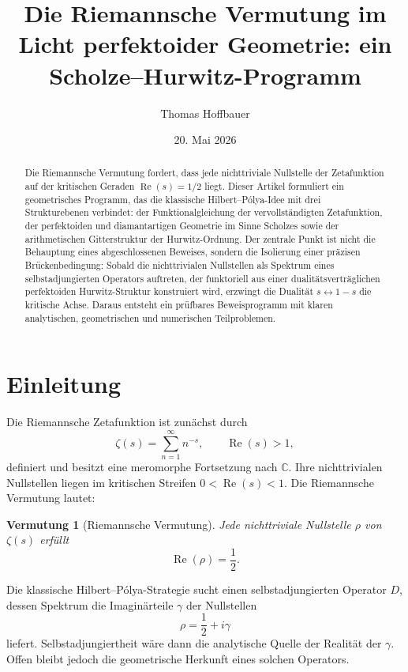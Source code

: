 \documentclass[11pt,a4paper,reqno]{amsart}
\title[RH, Scholze und Hurwitz-Geometrie]{Die Riemannsche Vermutung im Licht perfektoider Geometrie: ein Scholze--Hurwitz-Programm}
\author{Thomas Hoffbauer}
\date{20. Mai 2026}
\newtheorem{conjecture}[theorem]{Vermutung}
\theoremstyle{definition}
\numberwithin{equation}{section}
\newcommand{\C}{\mathbb{C}}
\newcommand{\Reals}{\operatorname{Re}}
\begin{document}
\begin{abstract}
Die Riemannsche Vermutung fordert, dass jede nichttriviale Nullstelle der Zetafunktion auf der kritischen Geraden
\(\Reals(s)=1/2\) liegt. Dieser Artikel formuliert ein geometrisches Programm, das die klassische Hilbert--Pólya-Idee mit drei Strukturebenen verbindet: der Funktionalgleichung der vervollständigten Zetafunktion, der perfektoiden und diamantartigen Geometrie im Sinne Scholzes sowie der arithmetischen Gitterstruktur der Hurwitz-Ordnung. Der zentrale Punkt ist nicht die Behauptung eines abgeschlossenen Beweises, sondern die Isolierung einer präzisen Brückenbedingung: Sobald die nichttrivialen Nullstellen als Spektrum eines selbstadjungierten Operators auftreten, der funktoriell aus einer dualitätsverträglichen perfektoiden Hurwitz-Struktur konstruiert wird, erzwingt die Dualität \(s\leftrightarrow 1-s\) die kritische Achse. Daraus entsteht ein prüfbares Beweisprogramm mit klaren analytischen, geometrischen und numerischen Teilproblemen.
\end{abstract}

\maketitle

\tableofcontents

\section{Einleitung}

Die Riemannsche Zetafunktion ist zunächst durch
\begin{equation}
  \zeta(s)=\sum_{n=1}^{\infty}n^{-s},\qquad \Reals(s)>1,
\end{equation}
definiert und besitzt eine meromorphe Fortsetzung nach \(\C\). Ihre nichttrivialen Nullstellen liegen im kritischen Streifen \(0<\Reals(s)<1\). Die Riemannsche Vermutung lautet:
\begin{conjecture}[Riemannsche Vermutung]
Jede nichttriviale Nullstelle \(\rho\) von \(\zeta(s)\) erfüllt
\[
  \Reals(\rho)=\frac12.
\]
\end{conjecture}

Die klassische Hilbert--Pólya-Strategie sucht einen selbstadjungierten Operator \(D\), dessen Spektrum die Imaginärteile \(\gamma\) der Nullstellen
\[
  \rho=\frac12+i\gamma
\]
liefert. Selbstadjungiertheit wäre dann die analytische Quelle der Realität der \(\gamma\). Offen bleibt jedoch die geometrische Herkunft eines solchen Operators.
\end{document}
